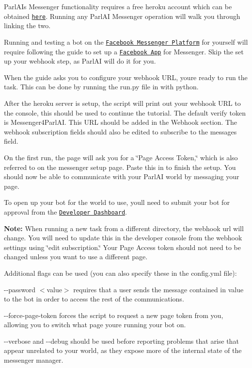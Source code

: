 \begin{DoxyItemize}
\item Parl\+AI\textquotesingle{}s Messenger functionality requires a free heroku account which can be obtained \href{https://signup.heroku.com/}{\tt here}. Running any Parl\+AI Messenger operation will walk you through linking the two.
\item Running and testing a bot on the \href{https://developers.facebook.com/docs/messenger-platform}{\tt Facebook Messenger Platform} for yourself will require following the guide to set up a \href{https://developers.facebook.com/docs/messenger-platform/getting-started/app-setup}{\tt Facebook App} for Messenger. Skip the set up your webhook step, as Parl\+AI will do it for you.
\item When the guide asks you to configure your webhook U\+RL, you\textquotesingle{}re ready to run the task. This can be done by running the {\ttfamily run.\+py} file in with python.
\item After the heroku server is setup, the script will print out your webhook U\+RL to the console, this should be used to continue the tutorial. The default verify token is {\ttfamily Messenger4\+Parl\+AI}. This U\+RL should be added in the Webhook section. The webhook subscription fields should also be edited to subscribe to the {\ttfamily messages} field.
\item On the first run, the page will ask you for a \char`\"{}\+Page Access Token,\char`\"{} which is also referred to on the messenger setup page. Paste this in to finish the setup. You should now be able to communicate with your Parl\+AI world by messaging your page.
\item To open up your bot for the world to use, you\textquotesingle{}ll need to submit your bot for approval from the \href{https://developers.facebook.com/apps/}{\tt Developer Dashboard}.
\end{DoxyItemize}

{\bfseries Note\+:} When running a new task from a different directory, the webhook url will change. You will need to update this in the developer console from the webhook settings using \char`\"{}edit subscription.\char`\"{} Your Page Access token should not need to be changed unless you want to use a different page.

Additional flags can be used (you can also specify these in the {\ttfamily config.\+yml} file)\+:


\begin{DoxyItemize}
\item {\ttfamily -\/-\/password $<$value$>$} requires that a user sends the message contained in {\ttfamily value} to the bot in order to access the rest of the communications.
\item {\ttfamily -\/-\/force-\/page-\/token} forces the script to request a new page token from you, allowing you to switch what page you\textquotesingle{}re running your bot on.
\item {\ttfamily -\/-\/verbose} and {\ttfamily -\/-\/debug} should be used before reporting problems that arise that appear unrelated to your world, as they expose more of the internal state of the messenger manager.
\end{DoxyItemize}

